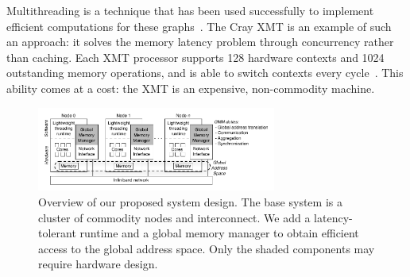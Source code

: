 \documentclass[10pt,nocopyrightspace]{sigplanconf}
\begin{document}






Multithreading is a technique that has been used successfully to
implement efficient computations for these
graphs~\cite{bader:bfsmta}. The Cray XMT is an example of such an
approach: it solves the memory latency problem through concurrency
rather than caching. Each XMT processor supports 128 hardware contexts
and 1024 outstanding memory operations, and is able to switch contexts
every cycle~\cite{tera, feo-xmt}. This ability comes at a cost: the
XMT is an expensive, non-commodity machine.

\begin{figure}[htbp]
  \begin{center}
    \vspace{-0.25in}
    \includegraphics[width=0.7\textwidth]{figures/system-overview.pdf}
    \vspace{-0.1in}
	\end{center}
	\caption{Overview of our proposed system design. The base
          system is a cluster of commodity nodes and interconnect. We
          add a latency-tolerant runtime and a global memory manager
          to obtain efficient access to the global address space. Only
          the shaded components may require hardware design.}
	\label{fig:system-overview}
\end{figure}
\end{document}
